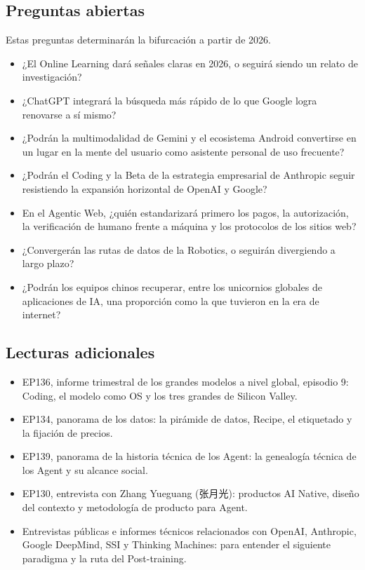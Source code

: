 \documentclass[a4paper]{article}
\begin{document}
\subsection{Preguntas abiertas}

Estas preguntas determinarán la bifurcación a partir de 2026.

\begin{itemize}
\item ¿El Online Learning dará señales claras en 2026, o seguirá siendo un relato de investigación?
\item ¿ChatGPT integrará la búsqueda más rápido de lo que Google logra renovarse a sí mismo?
\item ¿Podrán la multimodalidad de Gemini y el ecosistema Android convertirse en un lugar en la mente del usuario como asistente personal de uso frecuente?
\item ¿Podrán el Coding y la Beta de la estrategia empresarial de Anthropic seguir resistiendo la expansión horizontal de OpenAI y Google?
\item En el Agentic Web, ¿quién estandarizará primero los pagos, la autorización, la verificación de humano frente a máquina y los protocolos de los sitios web?
\item ¿Convergerán las rutas de datos de la Robotics, o seguirán divergiendo a largo plazo?
\item ¿Podrán los equipos chinos recuperar, entre los unicornios globales de aplicaciones de IA, una proporción como la que tuvieron en la era de internet?
\end{itemize}

\subsection{Lecturas adicionales}

\begin{itemize}
\item EP136, informe trimestral de los grandes modelos a nivel global, episodio 9: Coding, el modelo como OS y los tres grandes de Silicon Valley.
\item EP134, panorama de los datos: la pirámide de datos, Recipe, el etiquetado y la fijación de precios.
\item EP139, panorama de la historia técnica de los Agent: la genealogía técnica de los Agent y su alcance social.
\item EP130, entrevista con Zhang Yueguang (张月光): productos AI Native, diseño del contexto y metodología de producto para Agent.
\item Entrevistas públicas e informes técnicos relacionados con OpenAI, Anthropic, Google DeepMind, SSI y Thinking Machines: para entender el siguiente paradigma y la ruta del Post-training.
\end{itemize}
\end{document}
